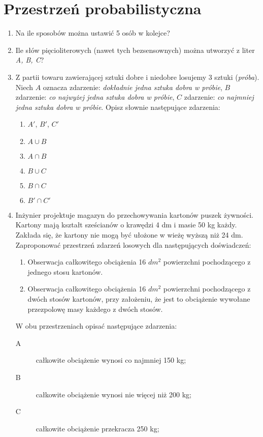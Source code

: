 \documentclass{mwart}
\newcommand{\ans}[1]{}
\newcommand{\ans}[1]{\emph{Odpowiedź:} #1}
\begin{document}
\section{Przestrzeń probabilistyczna}
\begin{enumerate}
\item Na ile sposobów można ustawić 5 osób w kolejce? \ans{$5!$}
\item Ile słów pięcioliterowych (nawet tych bezsensownych) można utworzyć z liter \emph{A, B, C}? \ans{$3^5=243$}
\item Z partii towaru zawierającej sztuki dobre i niedobre losujemy 3 sztuki (\emph{próba}). Niech $A$ oznacza zdarzenie: \emph{dokładnie jedna sztuka dobra w próbie}, $B$ zdarzenie: \emph{co najwyżej jedna sztuka dobra w próbie}, $C$ zdarzenie: \emph{co najmniej jedna sztuka dobra w próbie}. Opisz słownie następujące zdarzenia:
\begin{enumerate}
\item $A'$, $B'$, $C'$
\item $A\cup B$
\item $A\cap B$
\item $B\cup C$
\item $B\cap C$
\item $B'\cap C'$
\end{enumerate}
\item Inżynier projektuje magazyn do przechowywania kartonów puszek żywności. Kartony mają kształt sześcianów o krawędzi 4 dm i masie 50 kg każdy. Zakłada się, że kartony nie mogą być ułożone w wieżę wyższą niż 24 dm. Zaproponować przestrzeń zdarzeń losowych dla następujących doświadczeń:
\begin{enumerate}
\item Obserwacja całkowitego obciążenia 16 $dm^2$ powierzchni pochodzącego z jednego stosu kartonów.
\item Obserwacja całkowitego obciążenia 16 $dm^2$ powierzchni pochodzącego z dwóch stosów kartonów, przy założeniu, że jest to obciążenie wywołane przezpolowę masy każdego z dwóch stosów.
\end{enumerate}
W obu przestrzeniach opisać następujące zdarzenia:
\begin{description}
\item[A] całkowite obciążenie wynosi co najmniej 150 kg;
\item[B] całkowite obciążenie wynosi nie więcej niż 200 kg;
\item[C] całkowite obciążenie przekracza 250 kg;
\end{description}

\end{enumerate}
\end{document}
